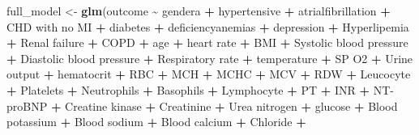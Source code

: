 \documentclass[
]{article}
\newenvironment{Shaded}{\begin{snugshade}}{\end{snugshade}}
\newcommand{\AttributeTok}[1]{\textcolor[rgb]{0.13,0.29,0.53}{#1}}
\newcommand{\FunctionTok}[1]{\textcolor[rgb]{0.13,0.29,0.53}{\textbf{#1}}}
\newcommand{\NormalTok}[1]{#1}
\newcommand{\OtherTok}[1]{\textcolor[rgb]{0.56,0.35,0.01}{#1}}
\newcommand{\SpecialCharTok}[1]{\textcolor[rgb]{0.81,0.36,0.00}{\textbf{#1}}}
\newcommand{\StringTok}[1]{\textcolor[rgb]{0.31,0.60,0.02}{#1}}
\begin{document}
\begin{Shaded}
\begin{Highlighting}[]
\NormalTok{full\_model }\OtherTok{\textless{}{-}} \FunctionTok{glm}\NormalTok{(outcome }\SpecialCharTok{\textasciitilde{}}\NormalTok{ gendera }\SpecialCharTok{+}\NormalTok{ hypertensive }\SpecialCharTok{+}\NormalTok{ atrialfibrillation }\SpecialCharTok{+} \StringTok{\textasciigrave{}}\AttributeTok{CHD with no MI}\StringTok{\textasciigrave{}} \SpecialCharTok{+} 
\NormalTok{            diabetes }\SpecialCharTok{+}\NormalTok{ deficiencyanemias }\SpecialCharTok{+}\NormalTok{ depression }\SpecialCharTok{+}\NormalTok{ Hyperlipemia }\SpecialCharTok{+} \StringTok{\textasciigrave{}}\AttributeTok{Renal failure}\StringTok{\textasciigrave{}} \SpecialCharTok{+} 
\NormalTok{            COPD }\SpecialCharTok{+}\NormalTok{ age }\SpecialCharTok{+} \StringTok{\textasciigrave{}}\AttributeTok{heart rate}\StringTok{\textasciigrave{}} \SpecialCharTok{+}\NormalTok{ BMI }\SpecialCharTok{+} \StringTok{\textasciigrave{}}\AttributeTok{Systolic blood pressure}\StringTok{\textasciigrave{}} \SpecialCharTok{+} 
            \StringTok{\textasciigrave{}}\AttributeTok{Diastolic blood pressure}\StringTok{\textasciigrave{}} \SpecialCharTok{+} \StringTok{\textasciigrave{}}\AttributeTok{Respiratory rate}\StringTok{\textasciigrave{}} \SpecialCharTok{+}\NormalTok{ temperature }\SpecialCharTok{+} 
            \StringTok{\textasciigrave{}}\AttributeTok{SP O2}\StringTok{\textasciigrave{}} \SpecialCharTok{+} \StringTok{\textasciigrave{}}\AttributeTok{Urine output}\StringTok{\textasciigrave{}} \SpecialCharTok{+}\NormalTok{ hematocrit }\SpecialCharTok{+}\NormalTok{ RBC }\SpecialCharTok{+}\NormalTok{ MCH }\SpecialCharTok{+}\NormalTok{ MCHC }\SpecialCharTok{+}\NormalTok{ MCV }\SpecialCharTok{+} 
\NormalTok{            RDW }\SpecialCharTok{+}\NormalTok{ Leucocyte }\SpecialCharTok{+}\NormalTok{ Platelets }\SpecialCharTok{+}\NormalTok{ Neutrophils }\SpecialCharTok{+}\NormalTok{ Basophils }\SpecialCharTok{+}\NormalTok{ Lymphocyte }\SpecialCharTok{+} 
\NormalTok{            PT }\SpecialCharTok{+}\NormalTok{ INR }\SpecialCharTok{+} \StringTok{\textasciigrave{}}\AttributeTok{NT{-}proBNP}\StringTok{\textasciigrave{}} \SpecialCharTok{+} \StringTok{\textasciigrave{}}\AttributeTok{Creatine kinase}\StringTok{\textasciigrave{}} \SpecialCharTok{+}\NormalTok{ Creatinine }\SpecialCharTok{+} \StringTok{\textasciigrave{}}\AttributeTok{Urea nitrogen}\StringTok{\textasciigrave{}} \SpecialCharTok{+} 
\NormalTok{            glucose }\SpecialCharTok{+} \StringTok{\textasciigrave{}}\AttributeTok{Blood potassium}\StringTok{\textasciigrave{}} \SpecialCharTok{+} \StringTok{\textasciigrave{}}\AttributeTok{Blood sodium}\StringTok{\textasciigrave{}} \SpecialCharTok{+} \StringTok{\textasciigrave{}}\AttributeTok{Blood calcium}\StringTok{\textasciigrave{}} \SpecialCharTok{+}\NormalTok{ Chloride }\SpecialCharTok{+} 

\end{Highlighting}
\end{Shaded}
\end{document}
